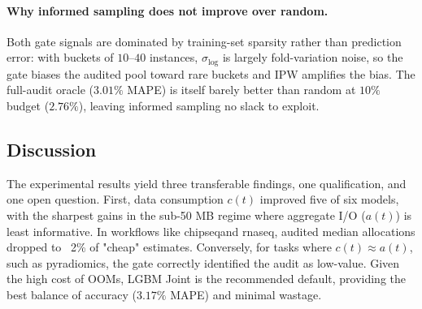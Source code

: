 \paragraph{Why informed sampling does not improve over random.}
Both gate signals are dominated by training-set sparsity
rather than prediction error: with buckets of $10$--$40$
instances, $\sigma_{\log}$ is largely fold-variation noise, so
the gate biases the audited pool toward rare buckets and IPW
amplifies the bias. The full-audit oracle ($3.01\%$ MAPE) is
itself barely better than random at $10\%$ budget ($2.76\%$),
leaving informed sampling no slack to exploit.

\subsection{Discussion}
\label{sec:discussion}




The experimental results yield three transferable findings, one qualification, and one open question.
First, data consumption $c(t)$ improved five of six models, with the sharpest gains in the sub-50 MB regime where aggregate I/O ($a(t)$) is least informative. In workflows like chipseqand rnaseq, audited median allocations dropped to ~2\% of "cheap" estimates. Conversely, for tasks where $c(t) \approx a(t)$, such as pyradiomics, the gate correctly identified the audit as low-value. Given the high cost of OOMs, LGBM Joint is the recommended default, providing the best balance of accuracy ($3.17\%$ MAPE) and minimal wastage.

